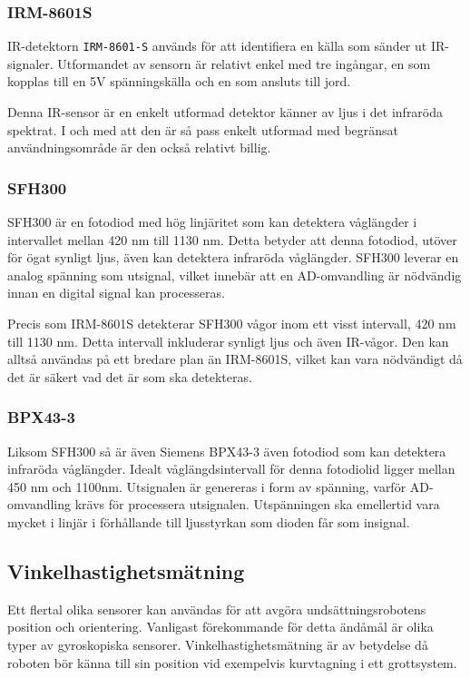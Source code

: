 \documentclass[11pt]{article}
\begin{document}
\begin{flushleft}
\subsubsection{IRM-8601S} %
IR-detektorn \verb+IRM-8601-S+ används för att identifiera en källa som sänder ut IR-signaler. Utformandet av sensorn är relativt enkel med tre ingångar, en som kopplas till en 5V spänningskälla och en som ansluts till jord.

Denna IR-sensor är en enkelt utformad detektor känner av ljus i det infraröda spektrat. I och med att den är så pass enkelt utformad med begränsat användningsområde är den också relativt billig.  

\subsubsection{SFH300} %
SFH300 är en fotodiod med hög linjäritet som kan detektera våglängder i intervallet mellan 420 nm till 1130 nm. Detta betyder att denna fotodiod, utöver för ögat synligt ljus, även kan detektera infraröda våglängder. SFH300 leverar en analog spänning som utsignal, vilket innebär att en AD-omvandling är nödvändig innan en digital signal kan processeras. \cite{Osram}

Precis som IRM-8601S detekterar SFH300 vågor inom ett visst intervall, 420 nm till 1130 nm. Detta intervall inkluderar synligt ljus och även IR-vågor. Den kan alltså användas på ett bredare plan än IRM-8601S, vilket kan vara nödvändigt då det är säkert vad det är som ska detekteras. \cite{Osram}

\subsubsection{BPX43-3}
Liksom SFH300 så är även Siemens BPX43-3 även fotodiod som kan detektera infraröda våglängder. Idealt våglängdsintervall för denna fotodiolid ligger mellan 450 nm och 1100nm. Utsignalen är genereras i form av spänning, varför AD-omvandling krävs för processera utsignalen. Utspänningen ska emellertid vara mycket i linjär i förhållande till ljusstyrkan som dioden får som insignal. \cite{siemens}

\subsection{Vinkelhastighetsmätning}
Ett flertal olika sensorer kan användas för att avgöra undsättningsrobotens position och orientering. Vanligast förekommande för detta ändåmål är olika typer av gyroskopiska sensorer. Vinkelhastighetsmätning är av betydelse då roboten bör känna till sin position vid exempelvis kurvtagning i ett grottsystem.


\end{flushleft}
\end{document}
